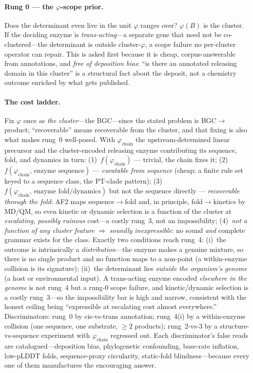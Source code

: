 \documentclass[11pt]{article}
\begin{document}
\paragraph{Rung 0 --- the $\varphi$-scope prior.} Does the determinant even live in the unit
$\varphi$ ranges over? $\varphi(B)$ is the cluster. If the deciding enzyme is \emph{trans-acting}---a
separate gene that need not be co-clustered---the determinant is outside cluster-$\varphi$, a scope
failure no per-cluster operator can repair. This is asked first because it is cheap, corpus-answerable
from annotations, and \emph{free of deposition bias}: ``is there an annotated releasing domain in this
cluster'' is a structural fact about the deposit, not a chemistry outcome enriched by what gets
published.

\paragraph{The cost ladder.} Fix $\varphi$ once as \emph{the cluster}---the BGC---since the stated
problem is BGC$\to$product; ``recoverable'' means recoverable from the cluster, and that fixing is
also what makes rung~0 well-posed. With $\varphi_{\text{chain}}$ the upstream-determined linear
precursor and the cluster-encoded releasing enzyme contributing its sequence, fold, and dynamics in
turn:
(1)~$f(\varphi_{\text{chain}})$ --- trivial, the chain fixes it;
(2)~$f(\varphi_{\text{chain}},\,\text{enzyme sequence})$ --- \emph{curatable from sequence} (cheap; a
finite rule set keyed to a sequence class, the PT-clade pattern);
(3)~$f(\varphi_{\text{chain}},\,\text{enzyme fold/dynamics})$ but not the sequence directly ---
\emph{recoverable through the fold}: AF2 maps sequence$\to$fold and, in principle, fold$\to$kinetics
by MD/QM, so even kinetic or dynamic selection is a function of the cluster at \emph{escalating,
possibly ruinous} cost---a costly rung~3, not an impossibility;
(4)~\emph{not a function of any cluster feature} $\Rightarrow$ \emph{soundly inexpressible}: no sound
\emph{and} complete grammar exists for the class. Exactly two conditions reach rung~4: (i)~the outcome
is intrinsically a \emph{distribution}---the enzyme makes a genuine mixture, so there is no single
product and no function maps to a non-point (a within-enzyme collision is its signature); (ii)~the
determinant lies \emph{outside the organism's genome} (a host or environmental input). A trans-acting
enzyme encoded \emph{elsewhere in the genome} is not rung~4 but a rung-0 scope failure, and
kinetic/dynamic selection is a costly rung~3---so the impossibility bar is high and narrow, consistent
with the honest ceiling being ``expressible at escalating cost almost everywhere.''
Discriminators: rung~0 by cis-vs-trans annotation; rung~4(i) by a within-enzyme collision (one
sequence, one substrate, $\geq\!2$ products); rung~2-vs-3 by a structure-vs-sequence experiment with
$\varphi_{\text{chain}}$ regressed out. Each discriminator's false reads are catalogued---deposition
bias, phylogenetic confounding, base-rate inflation, low-pLDDT folds, sequence-proxy circularity,
static-fold blindness---because every one of them manufactures the encouraging answer.
\end{document}
